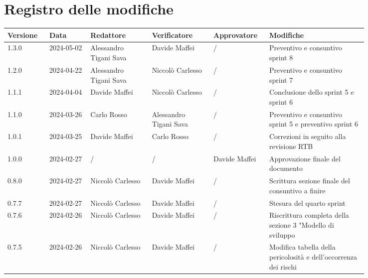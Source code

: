 \section*{Registro delle modifiche}
 {
  \renewcommand{\arraystretch}{1.5}
  \scriptsize
  \begin{longtable}{p{0.10\linewidth}p{0.10\linewidth}p{0.15\linewidth}p{0.15\linewidth}p{0.10\linewidth}p{0.24\linewidth}}
	  \textbf{Versione} & \textbf{Data} & \textbf{Redattore} & \textbf{Verificatore}  & \textbf{Approvatore} & \textbf{Modifiche} \\
	  \toprule
	  1.3.0             & 2024-05-02    & Alessandro Tigani Sava	& Davide Maffei		& /                    & Preventivo e consuntivo sprint 8	\\
	  \hline
	  1.2.0             & 2024-04-22    & Alessandro Tigani Sava	& Niccolò Carlesso	& /                    & Preventivo e consuntivo sprint 7	\\
	  \hline
	  1.1.1             & 2024-04-04    & Davide Maffei      & Niccolò Carlesso			& /                    & Conclusione dello sprint 5 e sprint 6	\\
	  \hline
	  1.1.0             & 2024-03-26    & Carlo Rosso        & Alessandro Tigani Sava	& /                    & Preventivo e consuntivo sprint 5 e preventivo sprint 6	\\
	  \hline
	  1.0.1             & 2024-03-25    & Davide Maffei      & Carlo Rosso            & /                    & Correzioni in seguito alla revisione RTB	\\
	  \hline
	  1.0.0             & 2024-02-27    & /                  & /                      & Davide Maffei        & Approvazione finale del documento	\\
	  \hline
	  0.8.0             & 2024-02-27    & Niccolò Carlesso   & Davide Maffei          & /                    & Scrittura sezione finale del consuntivo a finire	\\
	  \hline
	  0.7.7             & 2024-02-27    & Niccolò Carlesso   & Davide Maffei          & /                    & Stesura del quarto sprint	\\
	  \hline
	  0.7.6             & 2024-02-26    & Niccolò Carlesso   & Davide Maffei          & /                    & Riscrittura completa della sezione 3 "Modello di sviluppo	\\
	  \hline
	  0.7.5             & 2024-02-26    & Niccolò Carlesso   & Davide Maffei          & /                    & Modifica tabella della pericolosità e dell’occorrenza dei rischi  \\

\end{longtable}}
